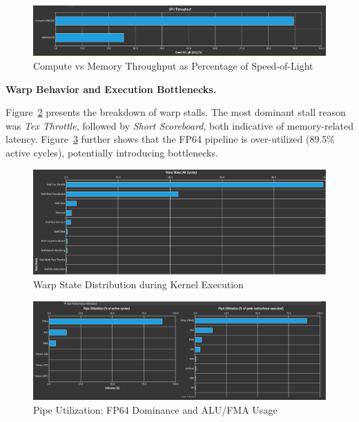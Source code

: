 \documentclass[conference, 10pt]{IEEEtran}
\begin{document}
\begin{figure}[H]
    \centering
    \includegraphics[width=0.9\linewidth]{figures/GPU_Throughput.png}
    \caption{Compute vs Memory Throughput as Percentage of Speed-of-Light}
    \label{fig:gpu-throughput}
\end{figure}

\textbf{Warp Behavior and Execution Bottlenecks.}

Figure~\ref{fig:warp-states} presents the breakdown of warp stalls. The most dominant stall reason was \textit{Tex Throttle}, followed by \textit{Short Scoreboard}, both indicative of memory-related latency.  
Figure~\ref{fig:pipe-utilization} further shows that the FP64 pipeline is over-utilized (89.5\% active cycles), potentially introducing bottlenecks.

\begin{figure}[H]
    \centering
    \includegraphics[width=0.95\linewidth]{figures/WarpState.png}
    \caption{Warp State Distribution during Kernel Execution}
    \label{fig:warp-states}
\end{figure}

\begin{figure}[H]
    \centering
    \includegraphics[width=0.95\linewidth]{figures/PipeUtilization.png}
    \caption{Pipe Utilization: FP64 Dominance and ALU/FMA Usage}
    \label{fig:pipe-utilization}
\end{figure}
\end{document}
